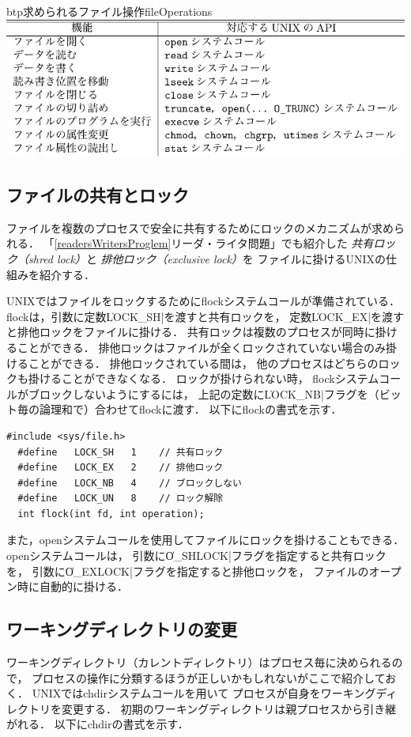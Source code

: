 \begin{mytable}{btp}{求められるファイル操作}{fileOperations}
  \includegraphics[scale=1.0]{Tbl/fileOperations.pdf}
\end{mytable}

\subsection{ファイルの共有とロック}
ファイルを複数のプロセスで安全に共有するためにロックのメカニズムが求められる．
「\ref{readersWritersProglem}リーダ・ライタ問題」でも紹介した
\emph{共有ロック（shred lock）}と
\emph{排他ロック（exclusive lock）}を
ファイルに掛けるUNIXの仕組みを紹介する．

UNIXではファイルをロックするためにflockシステムコールが準備されている．
flockは，引数に定数\|LOCK_SH|を渡すと共有ロックを，
定数\|LOCK_EX|を渡すと排他ロックをファイルに掛ける．
共有ロックは複数のプロセスが同時に掛けることができる．
排他ロックはファイルが全くロックされていない場合のみ掛けることができる．
排他ロックされている間は，
他のプロセスはどちらのロックも掛けることができなくなる．
ロックが掛けられない時，
flockシステムコールがブロックしないようにするには，
上記の定数に\|LOCK_NB|フラグを（ビット毎の論理和で）合わせてflockに渡す．
以下にflockの書式を示す．

\newpage
\begin{lstlisting}[numbers=none]
  #include <sys/file.h>
  #define   LOCK_SH   1    // 共有ロック
  #define   LOCK_EX   2    // 排他ロック
  #define   LOCK_NB   4    // ブロックしない
  #define   LOCK_UN   8    // ロック解除
  int flock(int fd, int operation);
\end{lstlisting}

また，openシステムコールを使用してファイルにロックを掛けることもできる．
openシステムコールは，
引数に\|O_SHLOCK|フラグを指定すると共有ロックを，
引数に\|O_EXLOCK|フラグを指定すると排他ロックを，
ファイルのオープン時に自動的に掛ける．

\subsection{ワーキングディレクトリの変更}
ワーキングディレクトリ（カレントディレクトリ）はプロセス毎に決められるので，
プロセスの操作に分類するほうが正しいかもしれないがここで紹介しておく．
UNIXではchdirシステムコールを用いて
プロセスが自身をワーキングディレクトリを変更する．
初期のワーキングディレクトリは親プロセスから引き継がれる．
以下にchdirの書式を示す．

